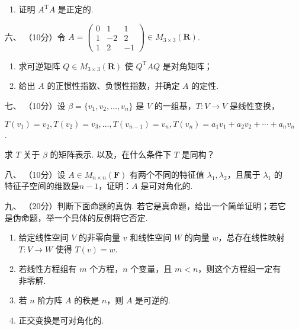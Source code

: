 \begin{enumerate}
\begin{enumerate}[label=(\arabic*)]
        \item 证明 $A^{\mathrm{T}}A$ 是正定的.
    \end{enumerate}

\item[六、]（10分）令 $A = \begin{pmatrix}0 & 1 & 1 \\ 1 & -2 & 2 \\ 1 & 2 & -1 \end{pmatrix} \in M_{3\times 3}(\mathbf R)$.
    \begin{enumerate}[label=(\arabic*)]
        \item 求可逆矩阵 $Q\in M_{3\times 3}(\mathbf R)$ 使 $Q^{\mathrm{T}}AQ$ 是对角矩阵；

        \item 给出 $A$ 的正惯性指数、负惯性指数，并确定 $A$ 的定性.
    \end{enumerate}

\item[七、]（10分）设 $\beta=\{v_1,v_2,\ldots,v_n\}$ 是 $V$ 的一组基，$T:V\to V$ 是线性变换，

    $T(v_1)=v_2,T(v_2)=v_3,\ldots,T(v_{n-1})=v_n,T(v_n)=a_1v_1+a_2v_2+\cdots+a_nv_n$.

    求 $T$ 关于 $\beta$ 的矩阵表示. 以及，在什么条件下 $T$ 是同构？

    \item[八、]（10分）设 $A\in M_{n\times n}(\mathbf{F})$ 有两个不同的特征值 $\lambda_1,\lambda_2$，且属于 $\lambda_1$ 的特征子空间的维数是$n-1$，证明：$A$ 是可对角化的.

    \item[九、]（20分）判断下面命题的真伪. 若它是真命题，给出一个简单证明；若它是伪命题，举一个具体的反例将它否定.
    \begin{enumerate}[label=(\arabic*)]
        \item 给定线性空间 $V$ 的非零向量 $v$ 和线性空间 $W$ 的向量 $w$，总存在线性映射 $T:V\to W$ 使得 $T(v)=w$.

        \item 若线性方程组有 $m$ 个方程，$n$ 个变量，且 $m < n$，则这个方程组一定有非零解.

        \item 若 $n$ 阶方阵 $A$ 的秩是 $n$，则 $A$ 是可逆的.

        \item 正交变换是可对角化的.
    \end{enumerate}
\end{enumerate}

\clearpage
